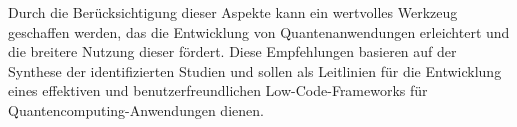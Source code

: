 Durch die Berücksichtigung dieser Aspekte kann ein wertvolles Werkzeug geschaffen werden, das die Entwicklung von Quantenanwendungen 
erleichtert und die breitere Nutzung dieser fördert. Diese Empfehlungen basieren auf der Synthese der 
identifizierten Studien und sollen als Leitlinien für die Entwicklung eines effektiven und benutzerfreundlichen Low-Code-Frameworks 
für Quantencomputing-Anwendungen dienen. 


